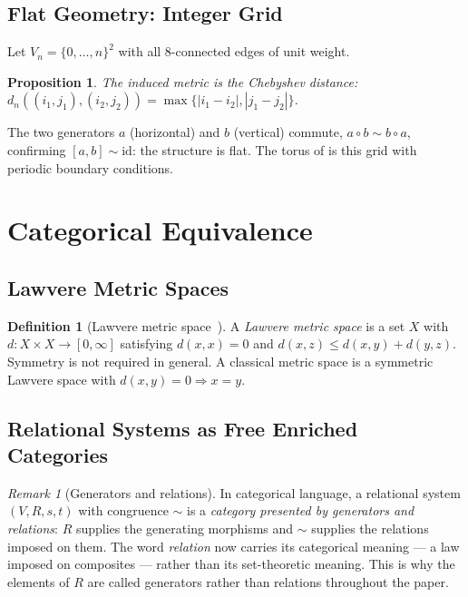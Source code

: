 \documentclass{article}
\newtheorem{proposition}[theorem]{Proposition}
\theoremstyle{definition}
\newtheorem{definition}[theorem]{Definition}
\theoremstyle{remark}
\newtheorem{remark}[theorem]{Remark}
\newcommand{\id}{\mathrm{id}}
\begin{document}
\subsection{Flat Geometry: Integer Grid}
\label{sec:grid}

Let $V_n = \{0,\dots,n\}^2$ with all 8-connected edges of unit
weight.

\begin{proposition}
The induced metric is the Chebyshev distance:
$d_n((i_1,j_1),(i_2,j_2)) = \max\{|i_1-i_2|, |j_1-j_2|\}$.
\end{proposition}

The two generators $a$ (horizontal) and $b$ (vertical) commute,
$a \circ b \sim b \circ a$, confirming $[a,b] \sim \id$: the
structure is flat. The torus of  is this grid
with periodic boundary conditions.

\section{Categorical Equivalence}
\label{sec:enriched}

\subsection{Lawvere Metric Spaces}

\begin{definition}[Lawvere metric space~\cite{lawvere}]
A \emph{Lawvere metric space} is a set $X$ with
$d : X \times X \to [0,\infty]$ satisfying $d(x,x) = 0$ and
$d(x,z) \leq d(x,y) + d(y,z)$. Symmetry is not required in
general. A classical metric space is a symmetric Lawvere space
with $d(x,y)=0 \Rightarrow x=y$.
\end{definition}

\subsection{Relational Systems as Free Enriched Categories}

\begin{remark}[Generators and relations]
In categorical language, a relational system $(V, R, s, t)$ with
congruence $\sim$ is a \emph{category presented by generators and
relations}: $R$ supplies the generating morphisms and $\sim$
supplies the relations imposed on them. The word \emph{relation}
now carries its categorical meaning --- a law imposed on
composites --- rather than its set-theoretic meaning. This is why
the elements of $R$ are called generators rather than relations
throughout the paper.
\end{remark}
\end{document}
